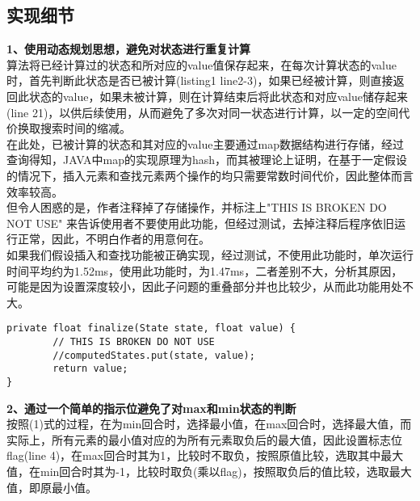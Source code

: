 \documentclass[UTF8]{article}
\begin{document}
\subsection{实现细节}
\indent\textbf{1、使用动态规划思想，避免对状态进行重复计算}\\
\indent 算法将已经计算过的状态和所对应的value值保存起来，在每次计算状态的value时，首先判断此状态是否已被计算(listing1 line2-3)，如果已经被计算，则直接返回此状态的value，如果未被计算，则在计算结束后将此状态和对应value储存起来(line 21)，以供后续使用，从而避免了多次对同一状态进行计算，以一定的空间代价换取搜索时间的缩减。\\
\indent 在此处，已被计算的状态和其对应的value主要通过map数据结构进行存储，经过查询得知，JAVA中map的实现原理为hash，而其被理论上证明，在基于一定假设的情况下，插入元素和查找元素两个操作的均只需要常数时间代价，因此整体而言效率较高。\\
\indent 但令人困惑的是，作者注释掉了存储操作，并标注上"THIS IS BROKEN DO NOT USE" 来告诉使用者不要使用此功能，但经过测试，去掉注释后程序依旧运行正常，因此，不明白作者的用意何在。\\
\indent 如果我们假设插入和查找功能被正确实现，经过测试，不使用此功能时，单次运行时间平均约为1.52ms，使用此功能时，为1.47ms，二者差别不大，分析其原因，可能是因为设置深度较小，因此子问题的重叠部分并也比较少，从而此功能用处不大。\\
\begin{lstlisting}[caption=存储state-value pair]
private float finalize(State state, float value) {
		// THIS IS BROKEN DO NOT USE
		//computedStates.put(state, value);
		return value;
}
\end{lstlisting}

\indent\textbf{2、通过一个简单的指示位避免了对max和min状态的判断}\\
\indent 按照(1)式的过程，在为min回合时，选择最小值，在max回合时，选择最大值，而实际上，所有元素的最小值对应的为所有元素取负后的最大值，因此设置标志位flag(line 4)，在max回合时其为1，比较时不取负，按照原值比较，选取其中最大值，在min回合时其为-1，比较时取负(乘以flag)，按照取负后的值比较，选取最大值，即原最小值。\\
\end{document}
